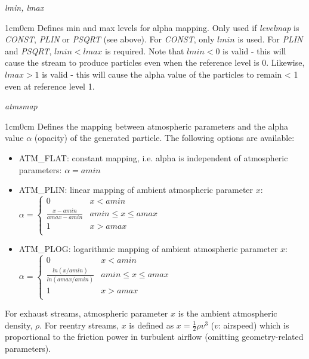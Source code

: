 \documentclass[Orbiter Developer Manual.tex]{subfiles}
\begin{document}
\noindent
\textit{lmin, lmax}
\begin{adjustwidth}{1cm}{0cm}
Defines min and max levels for alpha mapping. Only used if \textit{levelmap} is \textit{CONST}, \textit{PLIN} or \textit{PSQRT} (see above). For \textit{CONST}, only $lmin$ is used. For \textit{PLIN} and \textit{PSQRT}, $lmin < lmax$ is required. Note that $lmin < 0$ is valid - this will cause the stream to produce particles even when the reference level is 0. Likewise, $lmax > 1$ is valid - this will cause the alpha value of the particles to remain < 1 even at reference level 1.
\\
\end{adjustwidth}

\noindent
\textit{atmsmap}
\begin{adjustwidth}{1cm}{0cm}
Defines the mapping between atmospheric parameters and the alpha value $\alpha$ (opacity) of the generated particle. The following options are available:

\begin{itemize}
\item ATM\_FLAT: constant mapping, i.e. alpha is independent of atmospheric parameters: $\alpha = amin$
\item ATM\_PLIN: linear mapping of ambient atmospheric parameter $x$:\\
$\alpha = 
\left\{
\begin{array}{ll}
	0 & x < amin \\
	\frac{x - amin}{amax - amin} & amin \leq x \leq amax \\
	1 & x > amax \\
\end{array} 
\right. $
\item ATM\_PLOG: logarithmic mapping of ambient atmospheric parameter $x$:\\
$\alpha = 
\left\{
\begin{array}{ll}
	0 & x < amin \\
	\frac{ln(x / amin)}{ln(amax / amin)} & amin \leq x \leq amax \\
	1 & x > amax \\
\end{array} 
\right. $
\end{itemize}
For exhaust streams, atmospheric parameter $x$ is the ambient atmospheric density, $\rho$. For reentry streams, $x$ is defined as $x = \frac{1}{2}\rho v^{3}$ ($v$: airspeed) which is proportional to the friction power in turbulent airflow (omitting geometry-related parameters).\\
\\
\end{adjustwidth}
\end{document}

